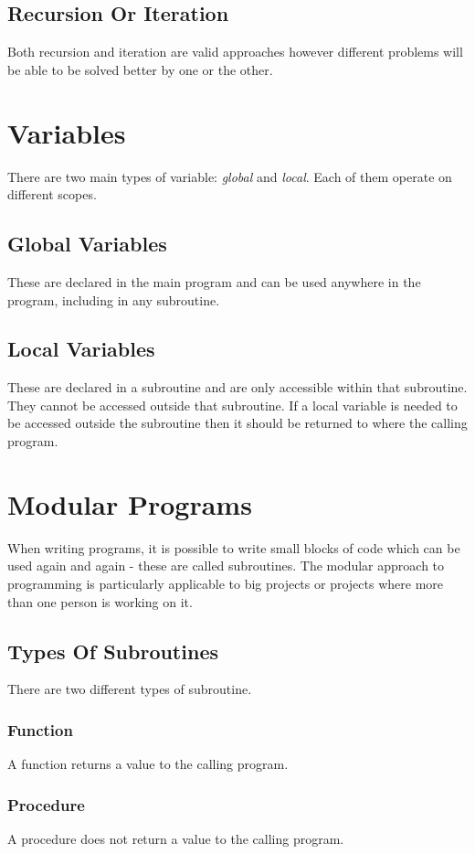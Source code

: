 \documentclass[a4paper,11pt, twocolumn]{article}
\begin{document}
\subsection{Recursion Or Iteration}
Both recursion and iteration are valid approaches however different problems will be able to be solved better by one or the other. 

\section{Variables}
There are two main types of variable: \textit{global} and \textit{local}. Each of them operate on different scopes.
\subsection{Global Variables}
These are declared in the main program and can be used anywhere in the program, including in any subroutine. 
\subsection{Local Variables}
These are declared in a subroutine and are only accessible within that subroutine. They cannot be accessed outside that subroutine. If a local variable is needed to be accessed outside the subroutine then it should be returned to where the calling program. 

\section{Modular Programs}
When writing programs, it is possible to write small blocks of code which can be used again and again - these are called subroutines. The modular approach to programming is particularly applicable to big projects or projects where more than one person is working on it. 
\subsection{Types Of Subroutines}
There are two different types of subroutine.
\subsubsection{Function}
A function returns a value to the calling program.
\subsubsection{Procedure}
A procedure does not return a value to the calling program.
\end{document}
